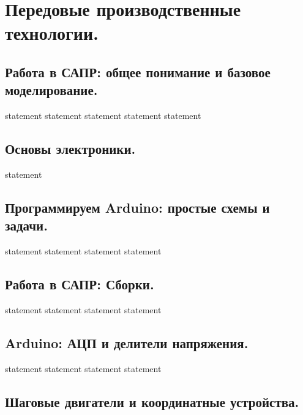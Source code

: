 \chapter{Передовые производственные технологии.}

\section{Работа в САПР: общее понимание и базовое моделирование.}

{statement}
{statement}
{statement}
{statement}
{statement}

\section{Основы электроники.}

{statement}

\section{Программируем Arduino: простые схемы и задачи.}

{statement}
{statement}
{statement}
{statement}

\section{Работа в САПР: Сборки.}

{statement}
{statement}
{statement}
{statement}

\section{Arduino: АЦП и делители напряжения.}

{statement}
{statement}
{statement}
{statement}

\section{Шаговые двигатели и координатные устройства.}

